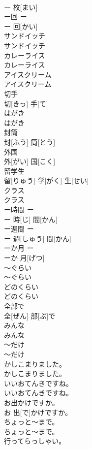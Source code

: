 \documentclass[8pt]{extreport}
\begin{document}
\begin{CJK}{UTF8}{min}
\\	ー 枚[まい]		
\\	ー回	ー
\\	ー 回[かい]		
\\	サンドイッチ	
\\	サンドイッチ		
\\	カレーライス	
\\	カレーライス		
\\	アイスクリーム	
\\	アイスクリーム		
\\	切手	
\\	切[きっ] 手[て]		
\\	はがき	
\\	はがき		
\\	封筒	
\\	封[ふう] 筒[とう]		
\\	外国	
\\	外[がい] 国[こく]		
\\	留学生	
\\	留[りゅう] 学[がく] 生[せい]		
\\	クラス	
\\	クラス		
\\	ー時間	ー 
\\	ー 時[じ] 間[かん]		
\\	ー週間	ー 
\\	ー 週[しゅう] 間[かん]		
\\	ーか月	ー 
\\	ーか 月[げつ]		
\\	～ぐらい	
\\	～ぐらい		
\\	どのくらい	
\\	どのくらい		
\\	全部で	
\\	全[ぜん] 部[ぶ]で		
\\	みんな	
\\	みんな		
\\	～だけ	
\\	～だけ		
\\	かしこまりました。	
\\	かしこまりました。		
\\	いいおてんきですね。	
\\	いいおてんきですね。		
\\	お出かけですか。	
\\	お 出[で]かけですか。		
\\	ちょっと～まで。	
\\	ちょっと～まで。		
\\	行ってらっしゃい。	

\end{CJK}
\end{document}
